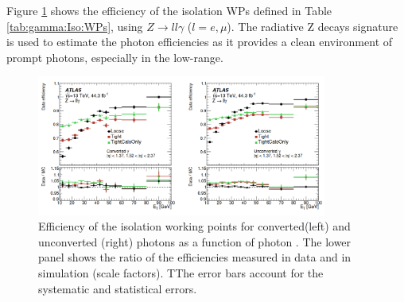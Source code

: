 Figure \ref{fig:gamma:Iso:Eff} shows the efficiency of the isolation WPs defined in Table \ref{tab:gamma:Iso:WPs}, using $Z\rightarrow ll\gamma$ ($l=e, \mu$). The radiative Z decays signature is used to estimate the photon efficiencies as it provides a clean environment of prompt photons, especially in the low-\eT range. 
\begin{figure}[htbp]
    \centering
    \includegraphics[width=0.85\textwidth]{Ch3/Img/Photon_Iso_Eff.png}
    \caption{Efficiency of the isolation working points for converted(left) and unconverted (right) photons as a function of photon \eT. The lower panel shows the ratio of the efficiencies measured in data and in simulation (scale factors). TThe error bars account for the systematic and statistical errors.}
    \label{fig:gamma:Iso:Eff}
\end{figure}

